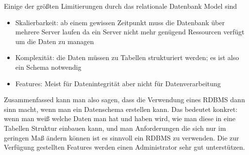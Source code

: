 Einige der größten Limitierungen \cite{MELD.CH2-relationaleDB.rdbmsBuch} durch das relationale Datenbank Model sind
\begin{itemize}
\item Skalierbarkeit: ab einem gewissen Zeitpunkt muss die Datenbank über mehrere Server laufen da ein Server nicht mehr genügend Ressourcen verfügt um die Daten zu managen
\item Komplexität: die Daten müssen zu Tabellen strukturiert werden; es ist also ein Schema notwendig
\item Features: Meist für Datenintegrität aber nicht für Datenverarbeitung 
\end{itemize}


Zusammenfassed kann man also sagen, dass die Verwendung eines RDBMS dann sinn macht, wenn man ein Datenschema erstellen kann. Das bedeutet konkret: wenn man weiß welche Daten man hat und haben wird, wie man diese in eine Tabellen Struktur einbauen kann, und man Anforderungen die sich nur im geringen Maß ändern können ist es sinnvoll ein RDBMS zu verwenden. Die zur Verfügung gestellten Features werden einen Administrator sehr gut unterstützen. 
\clearpage %